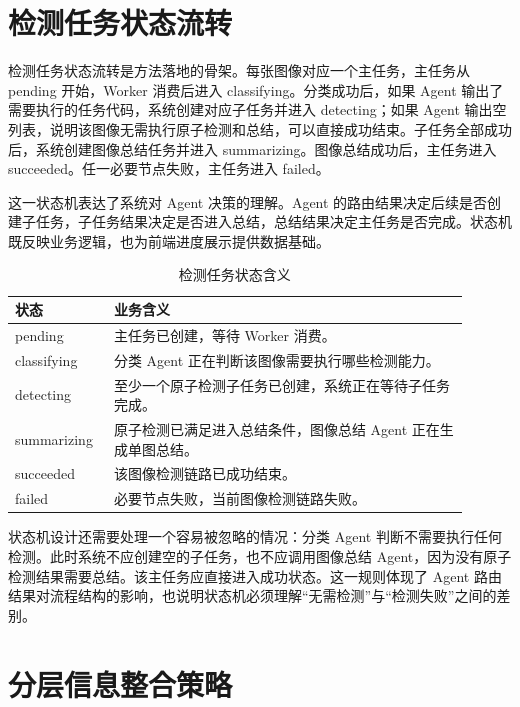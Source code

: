 \section{检测任务状态流转}
\label{sec:method-state-machine}

检测任务状态流转是方法落地的骨架。每张图像对应一个主任务，主任务从 pending 开始，Worker 消费后进入 classifying。分类成功后，如果 Agent 输出了需要执行的任务代码，系统创建对应子任务并进入 detecting；如果 Agent 输出空列表，说明该图像无需执行原子检测和总结，可以直接成功结束。子任务全部成功后，系统创建图像总结任务并进入 summarizing。图像总结成功后，主任务进入 succeeded。任一必要节点失败，主任务进入 failed。

这一状态机表达了系统对 Agent 决策的理解。Agent 的路由结果决定后续是否创建子任务，子任务结果决定是否进入总结，总结结果决定主任务是否完成。状态机既反映业务逻辑，也为前端进度展示提供数据基础。

\begin{table}[!htb]
  \caption{检测任务状态含义}\label{tab:detection-state-meaning}
  \centering
  \begin{tabular}{@{}p{0.18\linewidth}p{0.72\linewidth}@{}} \toprule
    \textbf{状态} & \textbf{业务含义} \\ \midrule
    pending & 主任务已创建，等待 Worker 消费。 \\
    classifying & 分类 Agent 正在判断该图像需要执行哪些检测能力。 \\
    detecting & 至少一个原子检测子任务已创建，系统正在等待子任务完成。 \\
    summarizing & 原子检测已满足进入总结条件，图像总结 Agent 正在生成单图总结。 \\
    succeeded & 该图像检测链路已成功结束。 \\
    failed & 必要节点失败，当前图像检测链路失败。 \\ \bottomrule
  \end{tabular}
\end{table}

状态机设计还需要处理一个容易被忽略的情况：分类 Agent 判断不需要执行任何检测。此时系统不应创建空的子任务，也不应调用图像总结 Agent，因为没有原子检测结果需要总结。该主任务应直接进入成功状态。这一规则体现了 Agent 路由结果对流程结构的影响，也说明状态机必须理解“无需检测”与“检测失败”之间的差别。

\section{分层信息整合策略}
\label{sec:hierarchical-integration}

